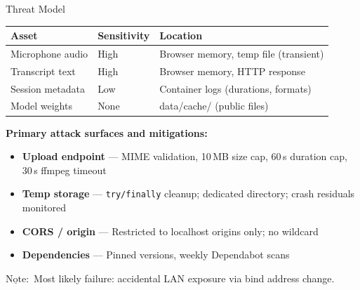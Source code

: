 \documentclass{beamer}
\newcommand{\nt}{$\underline{\text{Note}}:$ }
\begin{document}
\begin{frame}{Threat Model}
    \small
    \begin{table}
    \centering
    \scriptsize
    \begin{tabular}{lll}
        \toprule
        \textbf{Asset} & \textbf{Sensitivity} & \textbf{Location} \\
        \midrule
        Microphone audio  & High  & Browser memory, temp file (transient) \\
        Transcript text   & High  & Browser memory, HTTP response \\
        Session metadata  & Low   & Container logs (durations, formats) \\
        Model weights     & None  & data/cache/ (public files) \\
        \bottomrule
    \end{tabular}
    \end{table}

    \vspace{0.2em}
    \textbf{Primary attack surfaces and mitigations:}
    \begin{itemize}\setlength{\itemsep}{1pt}
        \item \textbf{Upload endpoint} --- MIME validation, 10\,MB size cap,
              60\,s duration cap, 30\,s ffmpeg timeout
        \item \textbf{Temp storage} --- \texttt{try/finally} cleanup;
              dedicated directory; crash residuals monitored
        \item \textbf{CORS / origin} --- Restricted to localhost origins only;
              no wildcard
        \item \textbf{Dependencies} --- Pinned versions, weekly Dependabot scans
    \end{itemize}

    \vspace{0.2em}
    \nt Most likely failure: accidental LAN exposure via bind address change.
\end{frame}
\end{document}
